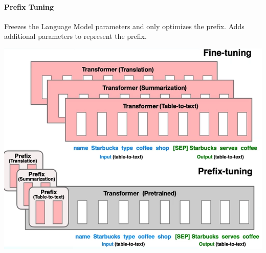 \documentclass[10pt]{report}
\begin{document}
\paragraph{Prefix Tuning} Freezes the Language Model parameters and only optimizes the prefix. Adds additional parameters to represent the prefix.
\begin{center}
	\includegraphics[scale=0.5]{87.png}
\end{center}
\end{document}

